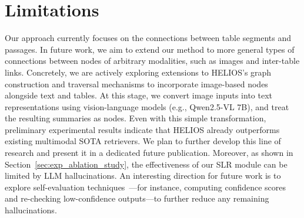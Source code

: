 {\editcolor 
\vspace{-1mm}
\section{Limitations}
\label{sec:limitations}
\vspace{-1mm}

Our approach currently focuses on the connections between table segments and passages. 
{\feditcolor
In future work, we aim to extend our method to more general types of connections between nodes of arbitrary modalities, such as images and inter-table links. 
Concretely, we are actively exploring extensions to HELIOS’s graph construction and traversal mechanisms to incorporate image-based nodes alongside text and tables. 
At this stage, we convert image inputs into text representations using vision-language models (e.g., Qwen2.5-VL 7B), and treat the resulting summaries as nodes. 
Even with this simple transformation, preliminary experimental results indicate that HELIOS already outperforms existing multimodal SOTA retrievers. We plan to further develop this line of research and present it in a dedicated future publication.
Moreover, as shown in Section~\ref{sec:exp_ablation_study}, the effectiveness of our SLR module can be limited by LLM hallucinations. 
An interesting direction for future work is to explore self-evaluation techniques~\citep{wangself, zhang2024self}—for instance, computing confidence scores and re-checking low-confidence outputs—to further reduce any remaining hallucinations.
}
}